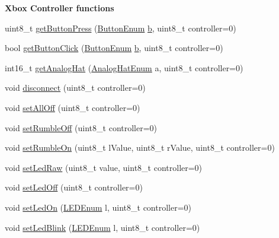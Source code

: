 \begin{Indent}{\bf \-Xbox \-Controller functions}\par
\begin{DoxyCompactItemize}
\item 
uint8\-\_\-t \hyperlink{class_x_b_o_x_r_e_c_v_a7c3aadc230ee4f8622a4d27dd716254d}{get\-Button\-Press} (\hyperlink{controller_enums_8h_a94f7389d205c78830a5441370d7870fd}{\-Button\-Enum} \hyperlink{_p_s4_parser_8h_a4313c9563516f94387762ab05763456b}{b}, uint8\-\_\-t controller=0)
\item 
bool \hyperlink{class_x_b_o_x_r_e_c_v_af27740a22386f55ba48ae1a67587eb19}{get\-Button\-Click} (\hyperlink{controller_enums_8h_a94f7389d205c78830a5441370d7870fd}{\-Button\-Enum} \hyperlink{_p_s4_parser_8h_a4313c9563516f94387762ab05763456b}{b}, uint8\-\_\-t controller=0)
\item 
int16\-\_\-t \hyperlink{class_x_b_o_x_r_e_c_v_a286c2fa2aa7f6e80108868bbb66c177b}{get\-Analog\-Hat} (\hyperlink{controller_enums_8h_a34dad8f0a0927471137c403216597093}{\-Analog\-Hat\-Enum} a, uint8\-\_\-t controller=0)
\item 
void \hyperlink{class_x_b_o_x_r_e_c_v_acb95505bebd1a9a3aee37097e39187f4}{disconnect} (uint8\-\_\-t controller=0)
\item 
void \hyperlink{class_x_b_o_x_r_e_c_v_ad045d22c1e2f0657f72786539f418751}{set\-All\-Off} (uint8\-\_\-t controller=0)
\item 
void \hyperlink{class_x_b_o_x_r_e_c_v_a2931e13960cde2c20adbcaf34cee84c5}{set\-Rumble\-Off} (uint8\-\_\-t controller=0)
\item 
void \hyperlink{class_x_b_o_x_r_e_c_v_addf7c0dcfbdb025f2283dcd118b5ab76}{set\-Rumble\-On} (uint8\-\_\-t l\-Value, uint8\-\_\-t r\-Value, uint8\-\_\-t controller=0)
\item 
void \hyperlink{class_x_b_o_x_r_e_c_v_a7986a3cf050bd91c7fed44a7e7eac125}{set\-Led\-Raw} (uint8\-\_\-t value, uint8\-\_\-t controller=0)
\item 
void \hyperlink{class_x_b_o_x_r_e_c_v_a741fda8096331cf86cf8534b04373b4a}{set\-Led\-Off} (uint8\-\_\-t controller=0)
\item 
void \hyperlink{class_x_b_o_x_r_e_c_v_a816d81caa0bdbf8523acb69e7693a142}{set\-Led\-On} (\hyperlink{controller_enums_8h_a70df64e026046bc352983127b7ae2cf0}{\-L\-E\-D\-Enum} l, uint8\-\_\-t controller=0)
\item 
void \hyperlink{class_x_b_o_x_r_e_c_v_a0bff2ed2e08cfbd657b5731ae1abec68}{set\-Led\-Blink} (\hyperlink{controller_enums_8h_a70df64e026046bc352983127b7ae2cf0}{\-L\-E\-D\-Enum} l, uint8\-\_\-t controller=0)

\end{DoxyCompactItemize}
\end{Indent}
